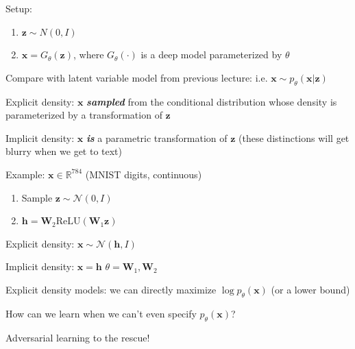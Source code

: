 \documentclass{beamer}
\let\tempone\itemize
\let\temptwo\enditemize
\renewenvironment{itemize}{\tempone\addtolength{\itemsep}{0.5\baselineskip}}{\temptwo}
\newcommand{\zvec}{\mathbf{z}}
\newcommand{\xvec}{\mathbf{x}}
\newcommand{\reals}{\ensuremath{\mathbb{R}}}
\begin{document}
\begin{frame}
\begin{center}
\end{center}
Setup:
\begin{enumerate}
\item $\zvec \sim N(0, I)$
\item $\xvec = G_\theta(\zvec)$, where $G_\theta(\cdot)$ is a deep model parameterized by $\theta$ \pause
\end{enumerate}
\pause
\vspace{5mm}
Compare with latent variable model from previous lecture: i.e. $\xvec \sim p_\theta( \xvec | \zvec)$
\begin{itemize}
\item Explicit density: $\xvec$ \textbf{\emph{sampled}} from the conditional distribution whose density is parameterized by a transformation of $\zvec$
\item Implicit density: $\xvec$ \textbf{\emph{is}} a parametric transformation of $\zvec$ 
\end{itemize}
(these distinctions will get blurry when we get to text)
\end{frame}

\begin{frame}
\begin{center}
\end{center}
Example: $\xvec \in \reals^{784}$ (MNIST digits, continuous) \\
\begin{enumerate}
\item Sample $\zvec \sim \mathcal{N}(0, I)$
\item $\mathbf{h} = \mathbf{W}_2\text{ReLU}(\mathbf{W}_1\zvec)$
\end{enumerate}
\pause
\begin{itemize}
\item Explicit density: $\xvec \sim \mathcal{N}(\mathbf{h}, I)$
\item Implicit density: $\xvec = \mathbf{h}$
\end{itemize}
$\theta = \mathbf{W}_1, \mathbf{W}_2$
\end{frame}

\begin{frame}
\begin{center}
\end{center}
\begin{itemize}
\item Explicit density models: we can directly maximize $\log p_\theta(\xvec)$ (or a lower bound)
\item How can we learn when we can't even specify $p_\theta(\xvec)$?
\item Adversarial learning to the rescue!
\end{itemize}
\end{frame}
\end{document}
